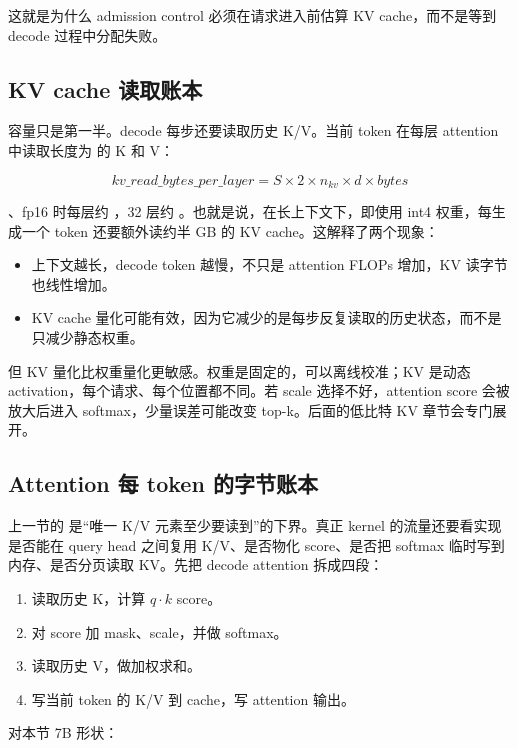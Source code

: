 这就是为什么 admission control 必须在请求进入前估算 KV cache，而不是等到 decode 过程中分配失败。

\subsection{KV cache 读取账本}

容量只是第一半。decode 每步还要读取历史 K/V。当前 token 在每层 attention 中读取长度为  的 K 和 V：

\[
kv\_read\_bytes\_per\_layer =
S \times 2 \times n_{kv} \times d \times bytes
\]

、fp16 时每层约 ，32 层约 。也就是说，在长上下文下，即使用 int4 权重，每生成一个 token 还要额外读约半 GB 的 KV cache。这解释了两个现象：

\begin{itemize}
  \item 上下文越长，decode token 越慢，不只是 attention FLOPs 增加，KV 读字节也线性增加。
  \item KV cache 量化可能有效，因为它减少的是每步反复读取的历史状态，而不是只减少静态权重。
\end{itemize}

但 KV 量化比权重量化更敏感。权重是固定的，可以离线校准；KV 是动态 activation，每个请求、每个位置都不同。若 scale 选择不好，attention score 会被放大后进入 softmax，少量误差可能改变 top-k。后面的低比特 KV 章节会专门展开。

\subsection{Attention 每 token 的字节账本}

上一节的  是“唯一 K/V 元素至少要读到”的下界。真正 kernel 的流量还要看实现是否能在 query head 之间复用 K/V、是否物化 score、是否把 softmax 临时写到内存、是否分页读取 KV。先把 decode attention 拆成四段：

\begin{enumerate}
  \item 读取历史 K，计算 \(q \cdot k\) score。
  \item 对 score 加 mask、scale，并做 softmax。
  \item 读取历史 V，做加权求和。
  \item 写当前 token 的 K/V 到 cache，写 attention 输出。
\end{enumerate}

对本节 7B 形状：

